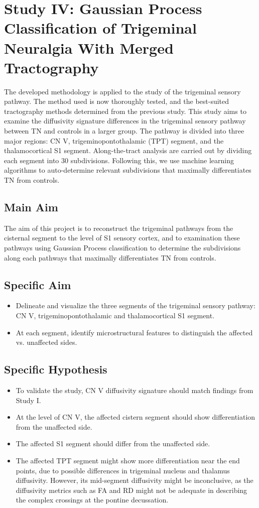 \section{Study IV: Gaussian Process Classification of Trigeminal Neuralgia With Merged Tractography}
The developed methodology is applied to the study of the trigeminal sensory pathway. The method used is now thoroughly tested, and the best-suited tractography methods determined from the previous study. This study aims to examine the diffusivity signature differences in the trigeminal sensory pathway between TN and controls in a larger group. The pathway is divided into three major regions: CN V, trigeminopontothalamic (TPT) segment, and the thalamocortical S1 segment. Along-the-tract analysis are carried out by dividing each segment into 30 subdivisions. Following this, we use machine learning algorithms to auto-determine relevant subdivisions that maximally differentiates TN from controls.

\subsection{Main Aim}
The aim of this project is to reconstruct the trigeminal pathways from the cisternal segment to the level of S1 sensory cortex, and to examination these pathways using Gaussian Process classification to determine the subdivisions along each pathways that maximally differentiates TN from controls.


\subsection{Specific Aim}
\begin{itemize}
    \item Delineate and visualize the three segments of the trigeminal sensory pathway: CN V, trigeminopontothalamic and  thalamocortical S1 segment. 
    \item At each segment, identify microstructural features to distinguish the affected vs. unaffected sides.
\end{itemize}

\subsection{Specific Hypothesis}
\begin{itemize}
    \item To validate the study, CN V diffusivity signature should match findings from Study I.
    \item At the level of CN V, the affected cistern segment should show differentiation from the unaffected side.
    \item The affected S1 segment should differ from the unaffected side.
    \item The affected TPT segment might show more differentiation near the end points, due to possible differences in trigeminal nucleus and thalamus diffusivity. However, its mid-segment diffusivity might be inconclusive, as the diffusivity metrics such as FA and RD might not be adequate in describing the complex crossings at the pontine decussation. 
\end{itemize}
